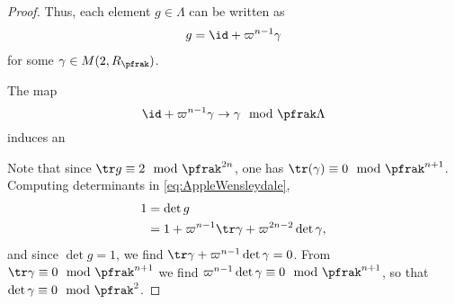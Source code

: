 \begin{proof}
    Thus, each element $g\in \Lambda$ can be written as
    \begin{align}\label{eq:AppleWensleydale}
        g = \id +\varpi^{n-1} \gamma
    \end{align}
    for some $\gamma \in M(2, R_\pfrak)$.
    \begin{claim}
        The map
        \[\id + \varpi^{n-1} \gamma \to \gamma \mod \pfrak\Lambda\]
        induces an
    \end{claim}

    Note that since $\tr g \equiv 2 \mod \pfrak^{2n}$, one has $\tr(\gamma) \equiv 0 \mod \pfrak^{n+1}$.
    Computing determinants in \ref{eq:AppleWensleydale},
    \begin{align*}
        1 & = \det g                                                  \\
          & = 1 + \varpi^{n-1} \tr \gamma + \varpi^{2n-2}\det \gamma,
    \end{align*}
    and since $\det g =1$, we find $\tr \gamma +\varpi^{n-1}\det \gamma =0$. From $\tr \gamma  \equiv 0 \mod \pfrak^{n+1}$ we find $ \varpi^{n-1}\det \gamma \equiv 0 \mod \pfrak^{n+1}$, so that $\det \gamma \equiv 0 \mod \pfrak^2$.







\end{proof}
